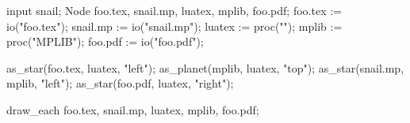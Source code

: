 \usemodule[zhfonts]
\startMPpage
input snail;
Node foo.tex, snail.mp, luatex, mplib, foo.pdf;
foo.tex := io("foo.tex");
snail.mp := io("snail.mp");
luatex := proc("\LUATEX");
mplib := proc("MPLIB");
foo.pdf := io("foo.pdf");

as_star(foo.tex, luatex, "left");
as_planet(mplib, luatex, "top");
as_star(snail.mp, mplib, "left");
as_star(foo.pdf, luatex, "right");

draw_each foo.tex, snail.mp, luatex, mplib, foo.pdf;

\stopMPpage
